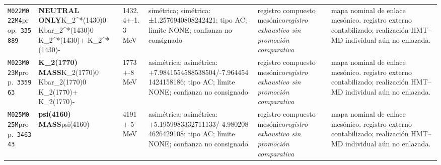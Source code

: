 \begin{landscape}
\begin{longtable}{L{1.85cm}L{4.45cm}L{2.35cm}L{4.05cm}L{3.35cm}L{7.15cm}}
\texttt{M022}\newline \texttt{M022M4}\newline prop.\ \texttt{335889} & \textbf{NEUTRAL ONLY}\newline K\_\allowbreak{}2\textasciicircum{}*(1430)0 \textbar{}\allowbreak{} Kbar\_\allowbreak{}2\textasciicircum{}*(1430)0 \textbar{}\allowbreak{} K\_\allowbreak{}2\textasciicircum{}*(1430)+ \textbar{}\allowbreak{} K\_\allowbreak{}2\textasciicircum{}*(1430)- & 1432.4+-1.3\,MeV & simétrica; simétrica: ±1.2576940808242421; tipo AC; límite NONE; confianza no consignado & registro compuesto mesónico\newline \emph{registro exhaustivo sin promoción comparativa} & mapa nominal de enlace mesónico. registro externo contabilizado; realización HMT--MD individual aún no enlazada. \\
\texttt{M023}\newline \texttt{M023M}\newline prop.\ \texttt{335963} & \textbf{K\_\allowbreak{}2(1770) MASS}\newline K\_\allowbreak{}2(1770)0 \textbar{}\allowbreak{} Kbar\_\allowbreak{}2(1770)0 \textbar{}\allowbreak{} K\_\allowbreak{}2(1770)+ \textbar{}\allowbreak{} K\_\allowbreak{}2(1770)- & 1773+-8\,MeV & asimétrica; asimétrica: +7.9841554588538504/-7.9644541424158186; tipo AC; límite NONE; confianza no consignado & registro compuesto mesónico\newline \emph{registro exhaustivo sin promoción comparativa} & mapa nominal de enlace mesónico. registro externo contabilizado; realización HMT--MD individual aún no enlazada. \\
\texttt{M025}\newline \texttt{M025M}\newline prop.\ \texttt{346343} & \textbf{psi(4160) MASS}\newline psi(4160) & 4191+-5\,MeV & asimétrica; asimétrica: +5.1959983332711133/-4.9802084626429108; tipo AC; límite NONE; confianza no consignado & registro compuesto mesónico\newline \emph{registro exhaustivo sin promoción comparativa} & mapa nominal de enlace mesónico. registro externo contabilizado; realización HMT--MD individual aún no enlazada. \\

\end{longtable}
\end{landscape}
